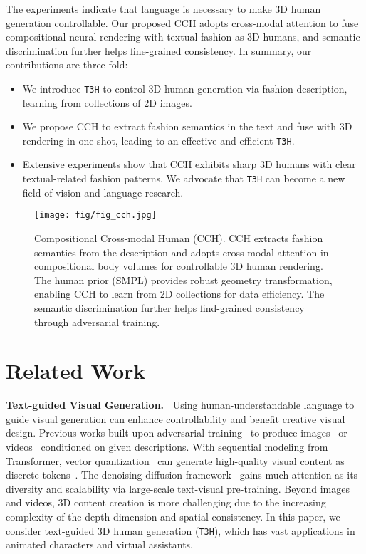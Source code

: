 \documentclass[11pt]{article}
\begin{document}
The experiments indicate that language is necessary to make 3D human generation controllable. Our proposed CCH adopts cross-modal attention to fuse compositional neural rendering with textual fashion as 3D humans, and semantic discrimination further helps fine-grained consistency. In summary, our contributions are three-fold:
\begin{itemize}[noitemsep, leftmargin=*, topsep=1pt]
    \item We introduce \texttt{T3H} to control 3D human generation via fashion description, learning from collections of 2D images.
    \item We propose CCH to extract fashion semantics in the text and fuse with 3D rendering in one shot, leading to an effective and efficient \texttt{T3H}.
    \item Extensive experiments show that CCH exhibits sharp 3D humans with clear textual-related fashion patterns. We advocate that \texttt{T3H} can become a new field of vision-and-language research.
\end{itemize}

\begin{figure*}[t]
\centering
    \texttt{[image: fig/fig\_cch.jpg]}
    \vspace{-1ex}
    \caption{Compositional Cross-modal Human (CCH). CCH extracts fashion semantics from the description and adopts cross-modal attention in compositional body volumes for controllable 3D human rendering. The human prior (SMPL) provides robust geometry transformation, enabling CCH to learn from 2D collections for data efficiency. The semantic discrimination further helps find-grained consistency through adversarial training.}
    \vspace{-2ex}
    \label{fig:cch}
\end{figure*}

\section{Related Work}
\textbf{Text-guided Visual Generation.~}
Using human-understandable language to guide visual generation can enhance controllability and benefit creative visual design. Previous works built upon adversarial training~\cite{goodfellow2015gan,reed2016t2i} to produce images~\cite{xu2108attn-gan,el-nouby2019geneva,fu2020sscr,fu2022ldast} or videos~\cite{marwah2017att-video-gen,li2018t2v,fu2022lbve} conditioned on given descriptions. With sequential modeling from Transformer, vector quantization~\cite{esser2021taming} can generate high-quality visual content as discrete tokens~\cite{ramesh2021dalle,ding2021cog-view,fu2023tvc}. The denoising diffusion framework~\cite{ho2020diffusion,ramesh2022dalle2,saharia2022imagen,feng2023training-free} gains much attention as its diversity and scalability via large-scale text-visual pre-training. Beyond images and videos, 3D content creation is more challenging due to the increasing complexity of the depth dimension and spatial consistency. In this paper, we consider text-guided 3D human generation (\texttt{T3H}), which has vast applications in animated characters and virtual assistants.
\end{document}
